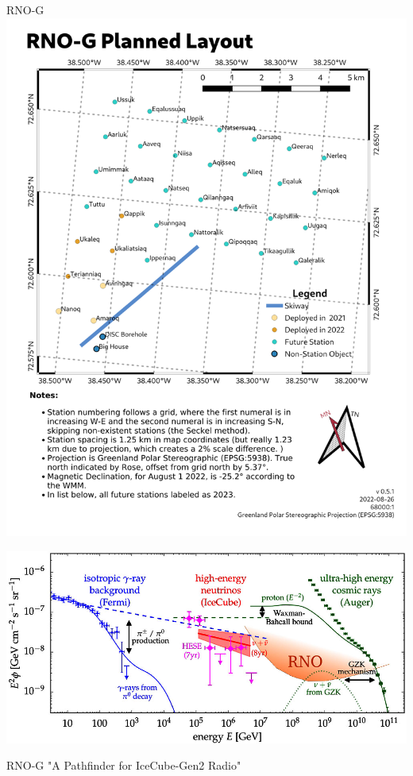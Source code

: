 \documentclass{beamer}
\begin{document}
\begin{frame}{RNO-G}
  \centering
  \includegraphics[height=\textheight]{figures/station-map.png}
\end{frame}
\begin{frame}
  \centering
  \includegraphics[width=\textwidth]{figures/range.jpg}
\end{frame}
\begin{frame}{RNO-G}
	"A Pathfinder for IceCube-Gen2 Radio"
\end{frame}
\end{document}
